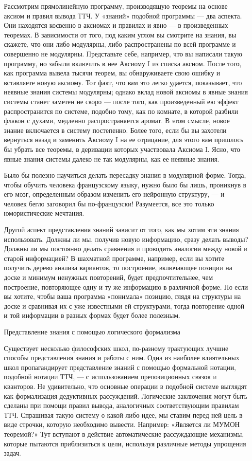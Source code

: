 \documentclass[../main.tex]{subfiles}
\begin{document}
Рассмотрим прямолинейную программу, производящую теоремы на основе аксиом и правил вывода ТТЧ. У «знаний» подобной программы --- два аспекта. Они находятся косвенно в аксиомах и правилах и явно --- в произведенных теоремах. В зависимости от того, под каким углом вы смотрите на знания, вы скажете, что они либо модулярны, либо распространены по всей программе и совершенно не модулярны. Представьте себе, например, что вы написали такую программу, но забыли включить в нее Аксиому I из списка аксиом. После того, как программа вывела тысячи теорем, вы обнаруживаете свою ошибку и вставляете новую аксиому. Тот факт, что вам это легко удается, показывает, что неявные знания системы модулярны; однако вклад новой аксиомы в явные знания системы станет заметен не скоро --- после того, как произведенный ею эффект распространится по системе, подобно тому, как по комнате, в которой разбили флакон с духами, медленно распространяется аромат. В этом смысле, новое знание включается в систему постепенно. Более того, если бы вы захотели вернуться назад и заменить Аксиому I на ее отрицание, для этого вам пришлось бы убрать все теоремы, в деривации которых участвовала Аксиома I. Ясно, что явные знания системы далеко не так модулярны, как ее неявные знания.

Было бы полезно научиться делать пересадку знания в модулярной форме. Тогда, чтобы обучить человека французскому языку, нужно было бы лишь, проникнув в его мозг, определенным образом изменить его нейронную структуру, --- и человек бегло заговорил бы по-французски! Разумеется, все это только юмористические мечтания.

Другой аспект представления знаний зависит от того, как мы хотим эти знания использовать. Должны ли мы, получив новую информацию, сразу делать выводы? Должны ли мы постоянно делать сравнения и проводить аналогии между новой и старой информацией? В шахматной программе, например, если вы хотите получить дерево анализа вариантов, то построение, включающее позиции на доске и минимум ненужных повторений, будет предпочтительнее, чем построение, повторяющее одну и ту же информацию в различной форме. Но если вы хотите, чтобы ваша программа «понимала» позицию, глядя на структуры на доске и сравнивая их с уже известными ей структурами, тогда повторение одной и той информации в разных формах будет более полезным.

Представление знания с помощью логического формализма

Существует несколько философских школ, по-разному трактующих лучшие способы представления знания и работы с ним. Одна из наиболее влиятельных школ пропагандирует представление знаний с помощью формальной нотации, подобной нотации ТТЧ, --- с использованием препозиционных связок и кванторов. Не удивительно, что основные операции в подобной системе выглядят как формализация дедуктивных рассуждений. Логические заключения могут быть сделаны при помощи правил вывода, аналогичных соответствующим правилам ТТЧ. Спрашивая такую систему о какой-либо идее, мы ставим перед ней цель в виде строчки, которую необходимо вывести. Например: «Является ли МУМОН теоремой?» Тут вступают в действие автоматические рассуждающие механизмы, которые пытаются приблизиться к цели, используя различные методы упрощения задач.
\end{document}
